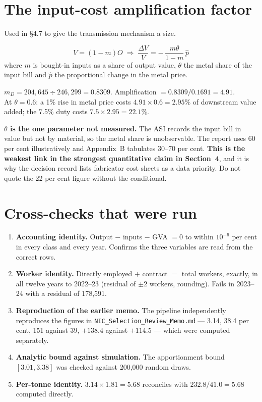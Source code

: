 \documentclass[11pt, a4paper]{article}
\begin{document}
\section{The input-cost amplification factor}
\label{sec:amp}

Used in §4.7 to give the transmission mechanism a size.

\[
V = (1-m)O \;\Longrightarrow\;
\frac{\Delta V}{V} = -\,\frac{m\theta}{1-m}\,\hat p
\]
where $m$ is bought-in inputs as a share of output value, $\theta$ the metal share of
the input bill and $\hat p$ the proportional change in the metal price.

\begin{work}
$m_D = 204{,}645 \div 246{,}299 = 0.8309$. Amplification $= 0.8309/0.1691 = 4.91$. \\
At $\theta = 0.6$: a 1\% rise in metal price costs $4.91 \times 0.6 = 2.95\%$ of
downstream value added; the 7.5\% duty costs $7.5 \times 2.95 = 22.1\%$.
\end{work}

\begin{caution}
\textbf{$\theta$ is the one parameter not measured.} The ASI records the input bill in
value but not by material, so the metal share is unobservable. The report uses 60 per
cent illustratively and Appendix~B tabulates 30--70 per cent. \textbf{This is the
weakest link in the strongest quantitative claim in Section~4}, and it is why the
decision record lists fabricator cost sheets as a data priority. Do not quote the
22 per cent figure without the conditional.
\end{caution}

\section{Cross-checks that were run}

\begin{enumerate}[leftmargin=1.6em, itemsep=3pt]
\item \textbf{Accounting identity.} Output $-$ inputs $-$ GVA $= 0$ to within
$10^{-6}$ per cent in every class and every year. Confirms the three variables are
read from the correct rows.
\item \textbf{Worker identity.} Directly employed $+$ contract $=$ total workers,
exactly, in all twelve years to 2022--23 (residual of $\pm 2$ workers, rounding).
Fails in 2023--24 with a residual of 178{,}591.
\item \textbf{Reproduction of the earlier memo.} The pipeline independently
reproduces the figures in \texttt{NIC\_Selection\_Review\_Memo.md} --- 3.14, 38.4 per
cent, 151 against 39, $+138.4$ against $+114.5$ --- which were computed separately.
\item \textbf{Analytic bound against simulation.} The apportionment bound
$[3.01, 3.38]$ was checked against 200{,}000 random draws.
\item \textbf{Per-tonne identity.} $3.14 \times 1.81 = 5.68$ reconciles with
$232.8 / 41.0 = 5.68$ computed directly.
\end{enumerate}
\end{document}

